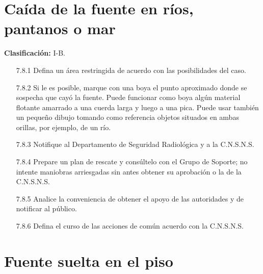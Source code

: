 \section{Caída de la fuente en ríos, pantanos o mar}

\textbf{Clasificación:} I-B.
\begin{enumerate}
  \item[7.8.1] Defina un área restringida de acuerdo con las posibilidades del caso.
  \item[7.8.2] Si le es posible, marque con una boya el punto aproximado donde se sospecha que cayó la fuente. Puede funcionar como boya algún material flotante amarrado a una cuerda larga y luego a una pica. Puede usar también un pequeño dibujo tomando como referencia objetos situados en ambas orillas, por ejemplo, de un río.
  \item[7.8.3] Notifique al Departamento de Seguridad Radiológica y a la C.N.S.N.S.
  \item[7.8.4] Prepare un plan de rescate y consúltelo con el Grupo de Soporte; no intente maniobras arriesgadas sin antes obtener su aprobación o la de la C.N.S.N.S.
  \item[7.8.5] Analice la conveniencia de obtener el apoyo de las autoridades y de notificar al público.
  \item[7.8.6] Defina el curso de las acciones de común acuerdo con la C.N.S.N.S.
\end{enumerate}

\section{Fuente suelta en el piso}

